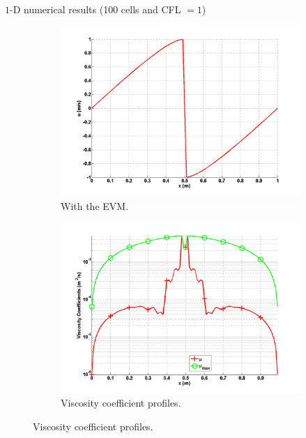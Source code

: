 \documentclass[xcolor=dvipsnames,10pt]{beamer}
\begin{document}
\begin{frame}{$1$-D numerical results (100 cells and CFL $=1$)}
\begin{figure}[H]
        \begin{subfigure}[b]{0.37\textwidth}
                \centering
                \includegraphics[width=\textwidth]{../figures/1D_sol_ev.png}
                \caption{With the EVM.}
        \end{subfigure}
        \begin{subfigure}[b]{0.37\textwidth}
                \centering
                \includegraphics[width=\textwidth]{../figures/1D_visc.png}
                \caption{Viscosity coefficient profiles.}
        \end{subfigure}
\end{figure}
\end{frame}
\end{document}
